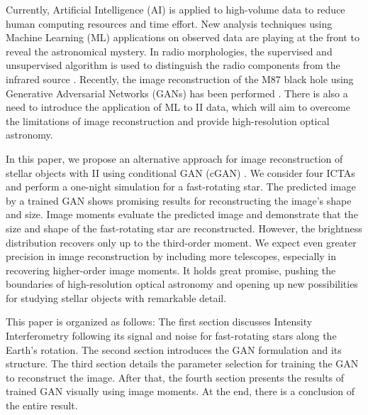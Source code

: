 Currently, Artificial Intelligence (AI) is applied to high-volume data to reduce human computing resources and time effort. New analysis techniques using Machine Learning (ML) applications on observed data are playing at the front to reveal the astronomical mystery. In radio morphologies, the supervised and unsupervised algorithm is used to distinguish the radio components from the infrared source \citep{wu2019radio, galvin2020cataloguing}. Recently, the image reconstruction of the M87 black hole using Generative Adversarial Networks (GANs) has been performed \citep{10.1093/mnras/stad3797}. There is also a need to introduce the application of ML to II data, which will aim to overcome the limitations of image reconstruction and provide high-resolution optical astronomy. 

In this paper, we propose an alternative approach for image reconstruction of stellar objects with II using conditional GAN (cGAN) \citep{goodfellow2014generative}. We consider four ICTAs and perform a one-night simulation for a fast-rotating star. The predicted image by a trained GAN shows promising results for reconstructing the image's shape and size. Image moments evaluate the predicted image and demonstrate that the size and shape of the fast-rotating star are reconstructed. However, the brightness distribution recovers only up to the third-order moment. We expect even greater precision in image reconstruction by including more telescopes, especially in recovering higher-order image moments. It holds great promise, pushing the boundaries of high-resolution optical astronomy and opening up new possibilities for studying stellar objects with remarkable detail.

This paper is organized as follows: The first section discusses Intensity Interferometry following its signal and noise for fast-rotating stars along the Earth's rotation. The second section introduces the GAN formulation and its structure. The third section details the parameter selection for training the GAN to reconstruct the image. After that, the fourth section presents the results of trained GAN visually using image moments. At the end, there is a conclusion of the entire result.